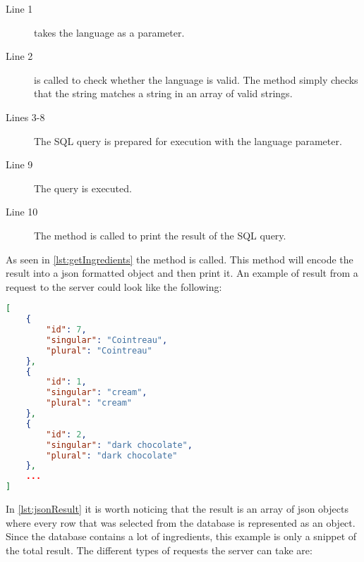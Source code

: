 \begin{description}
\item[Line 1]  takes the language as a parameter.
\item[Line 2]  is called to check whether the language is valid. The method simply checks that the string matches a string in an array of valid strings.
\item[Lines 3-8] The SQL query is prepared for execution with the language parameter.
\item[Line 9] The query is executed.
\item[Line 10] The  method is called to print the result of the SQL query.
\end{description}

As seen in \autoref{lst:getIngredients} the method  is called. This method will encode the result into a \ac{json} formatted object and then print it. An example of result from a request to the server could look like the following:

\begin{lstlisting}[language=json, label=lst:jsonResult, caption=Example result from \colorbox{background}{getIngredients()}]
[
    {
        "id": 7,
        "singular": "Cointreau",
        "plural": "Cointreau"
    },
    {
        "id": 1,
        "singular": "cream",
        "plural": "cream"
    },
    {
        "id": 2,
        "singular": "dark chocolate",
        "plural": "dark chocolate"
    },
    ...
]
\end{lstlisting}
In \autoref{lst:jsonResult} it is worth noticing that the result is an array of \ac{json} objects where every row that was selected from the database is represented as an object. Since the database contains a lot of ingredients, this example is only a snippet of the total result. The different types of requests the server can take are:

